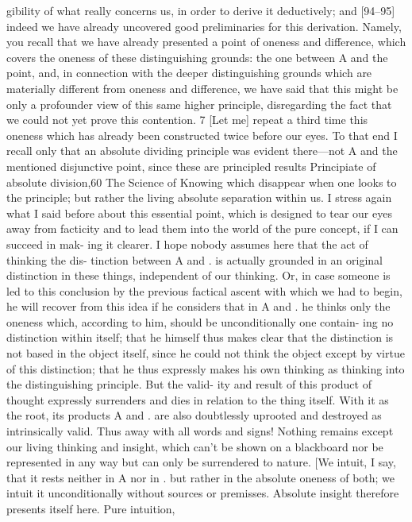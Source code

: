 gibility of what really concerns us, in order to derive it deductively; and
[94–95] indeed we have already uncovered good preliminaries for this
derivation. Namely, you recall that we have already presented a point of
oneness and difference, which covers the oneness of these distinguishing
grounds: the one between A and the point, and, in connection with the
deeper distinguishing grounds which are materially different from oneness
and difference, we have said that this might be only a profounder view of
this same higher principle, disregarding the fact that we could not yet prove
this contention. 7
[Let me] repeat a third time this oneness which has already been
constructed twice before our eyes. To that end I recall only that an absolute
dividing principle was evident there—not A and the mentioned disjunctive
point, since these are principled results {Principiate} of absolute division,60
The Science of Knowing
which disappear when one looks to the principle; but rather the living
absolute separation within us. I stress again what I said before about this
essential point, which is designed to tear our eyes away from facticity and
to lead them into the world of the pure concept, if I can succeed in mak-
ing it clearer. I hope nobody assumes here that the act of thinking the dis-
tinction between A and . is actually grounded in an original distinction in
these things, independent of our thinking. Or, in case someone is led to this
conclusion by the previous factical ascent with which we had to begin, he
will recover from this idea if he considers that in A and . he thinks only the
oneness which, according to him, should be unconditionally one contain-
ing no distinction within itself; that he himself thus makes clear that the
distinction is not based in the object itself, since he could not think the
object except by virtue of this distinction; that he thus expressly makes his
own thinking as thinking into the distinguishing principle. But the valid-
ity and result of this product of thought expressly surrenders and dies in
relation to the thing itself. With it as the root, its products A and . are also
doubtlessly uprooted and destroyed as intrinsically valid. Thus away with
all words and signs! Nothing remains except our living thinking and
insight, which can’t be shown on a blackboard nor be represented in any
way but can only be surrendered to nature.
[We intuit, I say, that it rests neither in A nor in . but rather in the
absolute oneness of both; we intuit it unconditionally without sources or
premisses. Absolute insight therefore presents itself here. Pure intuition,
